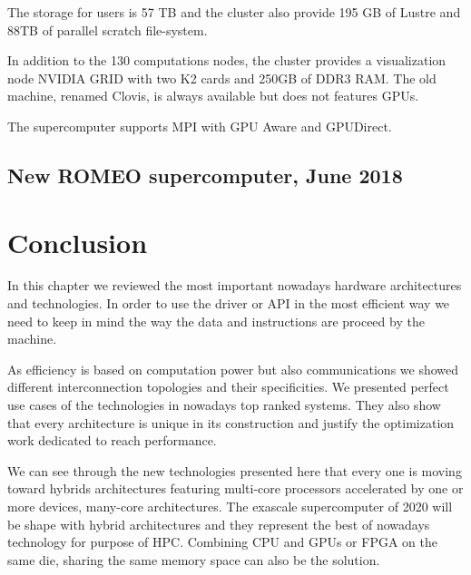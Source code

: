 The storage for users is 57 TB and the cluster also provide 195 GB of Lustre and 88TB of parallel scratch file-system. 

In addition to the 130 computations nodes, the cluster provides a visualization node NVIDIA GRID with two K2 cards and 250GB of DDR3 RAM. 
The old machine, renamed Clovis, is always available but does not features GPUs. 

The supercomputer supports MPI with GPU Aware and GPUDirect. 

\subsection{New ROMEO supercomputer, June 2018}


\section{Conclusion}

In this chapter we reviewed the most important nowadays hardware architectures and technologies. 
In order to use the driver or API in the most efficient way we need to keep in mind the way the data and instructions are proceed by the machine. 

As efficiency is based on computation power but also communications we showed different interconnection topologies and their specificities. 
We presented perfect use cases of the technologies in nowadays top ranked systems.
They also show that every architecture is unique in its construction and justify the optimization work dedicated to reach performance. 

We can see through the new technologies presented here that every one is moving toward hybrids architectures featuring multi-core processors accelerated by one or more devices, many-core architectures. 
The exascale supercomputer of 2020 will be shape with hybrid architectures and they represent the best of nowadays technology for purpose of HPC. 
Combining CPU and GPUs or FPGA on the same die, sharing the same memory space can also be the solution.
